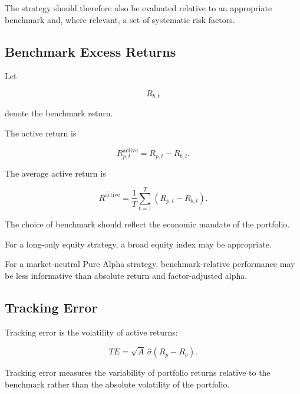 \documentclass[11pt,a4paper]{article}
\begin{document}
The strategy should therefore also be evaluated relative to an appropriate
benchmark and, where relevant, a set of systematic risk factors.


\subsection{Benchmark Excess Returns}

Let

\begin{equation}
R_{b,t}
\end{equation}

denote the benchmark return.

The active return is

\begin{equation}
\boxed{
R_{p,t}^{\mathrm{active}}
=
R_{p,t}
-
R_{b,t}.
}
\end{equation}

The average active return is

\begin{equation}
\overline{R^{\mathrm{active}}}
=
\frac{1}{T}
\sum_{t=1}^{T}
\left(
R_{p,t}-R_{b,t}
\right).
\end{equation}

The choice of benchmark should reflect the economic mandate of the portfolio.

For a long-only equity strategy, a broad equity index may be appropriate.

For a market-neutral Pure Alpha strategy, benchmark-relative performance may be
less informative than absolute return and factor-adjusted alpha.


\subsection{Tracking Error}

Tracking error is the volatility of active returns:

\begin{equation}
\boxed{
TE
=
\sqrt{A}
\,
\widehat{\sigma}
\left(
R_p-R_b
\right).
}
\end{equation}

Tracking error measures the variability of portfolio returns relative to the
benchmark rather than the absolute volatility of the portfolio.
\end{document}
